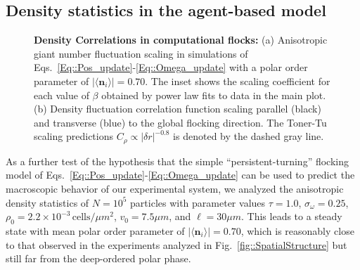 \documentclass[reprint,unsortedaddress,amsmath,amssymb,aps,pre]{revtex4-2}
\begin{document}
\subsection{Density statistics in the agent-based model}
\begin{figure}[ht]
        \caption{\label{fig::SpatialStructureComputational}
        \textbf{Density Correlations in computational flocks:}
        (a) Anisotropic giant number fluctuation scaling in simulations of Eqs.~\ref{Eq::Pos_update}-\ref{Eq::Omega_update} with a polar order parameter of $|\langle\mathbf{n}_{i}\rangle|=0.70$. The inset shows the scaling coefficient for each value of $\beta$ obtained by power law fits to data in the main plot. (b) Density fluctuation correlation function scaling parallel (black) and transverse (blue) to the global flocking direction. The Toner-Tu scaling predictions $C_{\rho}\propto|\delta{r}|^{-0.8}$ is denoted by the dashed gray line.
       }
\end{figure}
As a further test of the hypothesis that the simple ``persistent-turning'' flocking model of Eqs.~\ref{Eq::Pos_update}-\ref{Eq::Omega_update} can be used to predict the macroscopic behavior of our experimental system, we analyzed the anisotropic density statistics of $N=10^5$ particles with parameter values $\tau=1.0$, $\sigma_{\omega}=0.25$, $\rho_{0}=2.2\times10^{-3}\,\text{cells}/\mu{m}^{2}$, $v_{0}=7.5\mu{m}$, and $\ell=30\mu{m}$. This leads to a steady state with mean polar order parameter of $|\langle\mathbf{n}_{i}\rangle|=0.70$, which is reasonably close to that observed in the experiments analyzed in Fig.~\ref{fig::SpatialStructure} but still far from the deep-ordered polar phase. 
\end{document}
